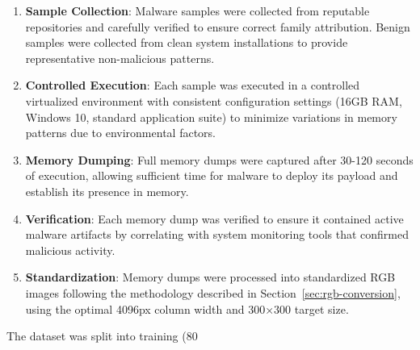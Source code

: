 \begin{enumerate}
    \item \textbf{Sample Collection}: Malware samples were collected from reputable repositories and carefully verified to ensure correct family attribution. Benign samples were collected from clean system installations to provide representative non-malicious patterns.
    
    \item \textbf{Controlled Execution}: Each sample was executed in a controlled virtualized environment with consistent configuration settings (16GB RAM, Windows 10, standard application suite) to minimize variations in memory patterns due to environmental factors.
    
    \item \textbf{Memory Dumping}: Full memory dumps were captured after 30-120 seconds of execution, allowing sufficient time for malware to deploy its payload and establish its presence in memory.
    
    \item \textbf{Verification}: Each memory dump was verified to ensure it contained active malware artifacts by correlating with system monitoring tools that confirmed malicious activity.
    
    \item \textbf{Standardization}: Memory dumps were processed into standardized RGB images following the methodology described in Section~\ref{sec:rgb-conversion}, using the optimal 4096px column width and 300×300 target size.
\end{enumerate}

The dataset was split into training (80%

